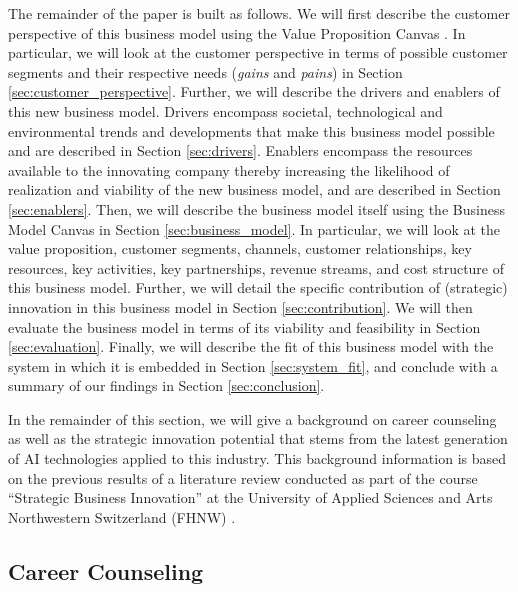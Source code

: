 The remainder of the paper is built as follows. We will first describe the customer perspective of this business
model using the Value Proposition Canvas \citep{osterwalderValuePropositionDesign2014}. In particular, we will look
at the customer perspective in terms of possible customer segments and their respective needs (\textit{gains} and
\textit{pains}) in Section \ref{sec:customer_perspective}. Further, we will describe the drivers and enablers of
this new business model. Drivers encompass societal, technological and environmental trends and developments that
make this business model possible and are described in Section \ref{sec:drivers}. Enablers encompass 
the resources available to the innovating company thereby increasing the likelihood of realization and viability of the
new business model, and are described in Section \ref{sec:enablers}. Then, we will describe the business model itself
using the Business Model Canvas \citep{osterwalderBusinessModelGeneration2010} in Section \ref{sec:business_model}.
In particular, we will look at the value proposition, customer segments, channels, customer relationships, key
resources, key activities, key partnerships, revenue streams, and cost structure of this business model.
Further, we will detail the specific contribution of (strategic) innovation in this business model in Section
\ref{sec:contribution}. We will then evaluate the business model in terms of its viability and feasibility in Section
\ref{sec:evaluation}. Finally, we will describe the fit of this business model with the system in which it is embedded
in Section \ref{sec:system_fit}, and conclude with a summary of our findings in Section \ref{sec:conclusion}.

In the remainder of this section, we will give a background on career counseling as well as the strategic
innovation potential that stems from the latest generation of AI technologies applied to this industry. This 
background information is based on the previous results of a literature review conducted as part of the course
``Strategic Business Innovation'' at the University of Applied Sciences and Arts Northwestern Switzerland (FHNW)
\citep{kaserAIpoweredCareerCounseling2023}.

\subsection{Career Counseling}

